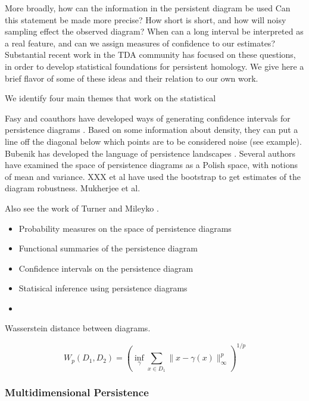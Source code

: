 More broadly, how can the information in the persistent diagram be used 
Can this statement be made more precise?
How short is short, and how will noisy sampling effect the observed diagram?
When can a long interval be interpreted as a real feature, and can we assign measures of confidence to our estimates?
Substantial recent work in the TDA community has focused on these questions, in order to develop statistical foundations for persistent homology.
We give here a brief flavor of some of these ideas and their relation to our own work.


We identify four main themes that work on the statistical 

Fasy and coauthors have developed ways of generating confidence intervals for persistence diagrams \citep{Fasy:2014}.
Based on some information about density, they can put a line off the diagonal below which points are to be considered noise (see example).
Bubenik has developed the language of persistence landscapes \cite{Bubenik:2007ux,Bubenik2015:um}.  
Several authors have examined the space of persistence diagrams as a Polish space, with notions of mean and variance.
XXX et al have used the bootstrap to get estimates of the diagram robustness.
Mukherjee et al.

Also see the work of Turner \cite{Turner:2012wb} and Mileyko \cite{Mileyko:2011jm}.

\begin{itemize}
\item Probability measures on the space of persistence diagrams
\item Functional summaries of the persistence diagram
\item Confidence intervals on the persistence diagram
\item Statisical inference using persistence diagrams
\item 
\end{itemize}

Wasserstein distance between diagrams.

\begin{equation}
W_{p}(D_{1},D_{2}) = \left( \inf_{\gamma} \sum_{x\in D_1} \|x-\gamma(x)\|^{p}_{\infty} \right)^{1/p}
\end{equation}


\subsubsection{Multidimensional Persistence}
\label{subsubsec:ph_multidim}

